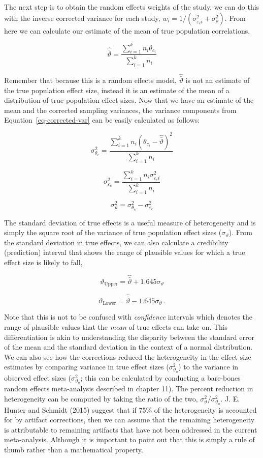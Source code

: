 \documentclass[
  letterpaper,
  DIV=11,
  numbers=noendperiod]{scrreprt}
\begin{document}
The next step is to obtain the random effects weights of the study, we
can do this with the inverse corrected variance for each study,
\(w_i=1/(\sigma^2_{\varepsilon_ci}+\sigma^2_\rho)\). From here we can
calculate our estimate of the mean of true population correlations,

\[
\hat{\bar{\vartheta}}=\frac{\sum^k_{i=1}n_i\theta_{c_i}}{\sum^k_{i=1}n_i}
\]

Remember that because this is a random effects model,
\(\hat{\bar{\vartheta}}\) is not an estimate of the true population
effect size, instead it is an estimate of the mean of a distribution of
true population effect sizes. Now that we have an estimate of the mean
and the corrected sampling variances, the variance components from
Equation~\ref{eq-corrected-var} can be easily calculated as follows:

\[
\sigma^2_{\theta_c} = \frac{\sum^k_{i=1}n_i(\theta_{c_i} - \hat{\bar{\vartheta}})^2}{\sum^k_{i=1}n_i}
\]

\[
\sigma^2_{\varepsilon_c} = \frac{\sum^k_{i=1}n_i\sigma^2_{\varepsilon_c i}}{\sum^k_{i=1}n_i}
\]

\[
\sigma^2_{\vartheta}  = \sigma^2_{\theta_c} - \sigma^2_{\varepsilon_c}
\]

The standard deviation of true effects is a useful measure of
heterogeneity and is simply the square root of the variance of true
population effect sizes (\(\sigma_{\vartheta}\)). From the standard
deviation in true effects, we can also calculate a credibility
(prediction) interval that shows the range of plausible values for which
a true effect size is likely to fall,

\[
\vartheta_{\text{Upper}} = \hat{\bar{\vartheta}} + 1.645\sigma_\vartheta
\]

\[
\vartheta_{\text{Lower}} = \hat{\bar{\vartheta}} - 1.645\sigma_\vartheta\, .
\]

Note that this is not to be confused with \emph{confidence} intervals
which denotes the range of plausible values that the \emph{mean} of true
effects can take on. This differentiation is akin to understanding the
disparity between the standard error of the mean and the standard
deviation in the context of a normal distribution. We can also see how
the corrections reduced the heterogeneity in the effect size estimates
by comparing variance in true effect sizes (\(\sigma^2_{\vartheta_o}\))
to the variance in observed effect sizes (\(\sigma^2_{\vartheta_o}\);
this can be calculated by conducting a bare-bones random effects
meta-analysis described in chapter 11). The percent reduction in
heterogeneity can be computed by taking the ratio of the two,
\(\sigma^2_{\vartheta}/\sigma^2_{\vartheta_o}\). J. E. Hunter and
Schmidt (2015) suggest that if 75\% of the heterogeneity is accounted
for by artifact corrections, then we can assume that the remaining
heterogeneity is attributable to remaining artifacts that have not been
addressed in the current meta-analysis. Although it is important to
point out that this is simply a rule of thumb rather than a mathematical
property.
\end{document}
